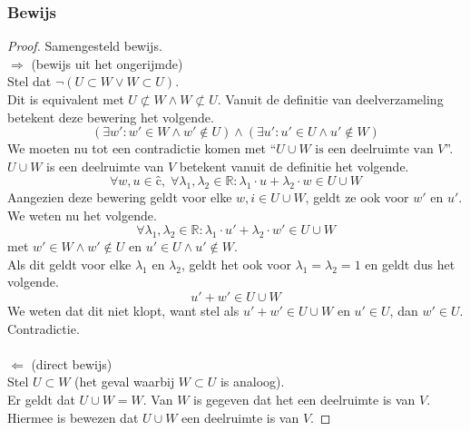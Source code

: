 \documentclass[lineaire_algebra_oplossingen.tex]{subfiles}
\begin{document}
\subsubsection*{Bewijs}
\begin{proof} Samengesteld bewijs.\\
$\Longrightarrow$ (bewijs uit het ongerijmde)\\ %
Stel dat $\neg(U \subset W \vee W \subset U)$.\\
Dit is equivalent met $U \not\subset W \wedge W \not\subset U$.
Vanuit de definitie van deelverzameling betekent deze bewering het volgende.
\[
(\exists w': w' \in W \wedge w' \not\in U) \wedge (\exists u': u' \in U \wedge u' \not\in W) 
\]
We moeten nu tot een contradictie komen met ``$U\cup W \text{ is een deelruimte van }V$''.
$U\cup W$ is een deelruimte van $V$ betekent vanuit de definitie het volgende.
\[
\forall w, u \in ĉ,\; \forall \lambda_1 , \lambda_2 \in \mathbb{R}: \lambda_1\cdot u + \lambda_2\cdot w \in U\cup W
\]
Aangezien deze bewering geldt voor elke $w,i \in U\cup W$, geldt ze ook voor $w'$ en $u'$.
We weten nu het volgende.
\[
\forall \lambda_1 , \lambda_2 \in \mathbb{R}: \lambda_1\cdot u' + \lambda_2\cdot w' \in U\cup W
\]
met $w' \in W \wedge w' \not\in U$ en $u' \in U \wedge u' \not\in W$.\\
Als dit geldt voor elke $\lambda_1$ en $\lambda_2$, geldt het ook voor $\lambda_1= \lambda_2 = 1$ en geldt dus het volgende.
\[
u' + w' \in U \cup W
\]
We weten dat dit niet klopt, want stel als $u' + w' \in U \cup W$ en $u' \in U$, dan $w' \in U$. Contradictie.\\\\
$\Longleftarrow$ (direct bewijs)\\
Stel $U \subset W$ (het geval waarbij $W \subset U$ is analoog).\\
Er geldt dat $U\cup W = W$. Van $W$ is gegeven dat het een deelruimte is van $V$. Hiermee is bewezen dat $U\cup W$ een deelruimte is van $V$.
\end{proof}
\end{document}

